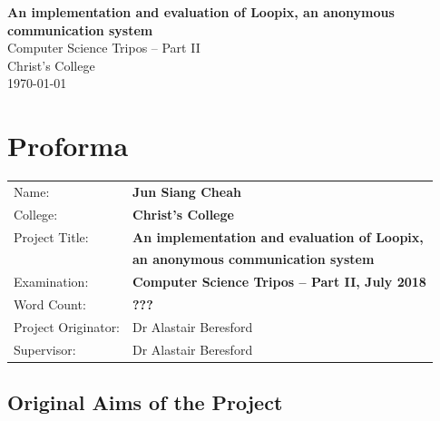 \documentclass[12pt,a4paper,twoside,openright]{report}
\begin{document}



\pagestyle{empty}


\vspace*{60mm}
\begin{center}
	\Huge
	\textbf{An implementation and evaluation of Loopix, an anonymous communication system} \\[5mm]
	Computer Science Tripos -- Part II \\[5mm]
	Christ's College \\[5mm]
	\today  %
\end{center}


\pagestyle{plain}

\chapter*{Proforma}

{\large
	\begin{tabular}{ll}
		Name:               & \bf Jun Siang Cheah                               \\
		College:            & \bf Christ's College                              \\
		Project Title:      & \bf An implementation and evaluation of Loopix,   \\ 
		& \bf an anonymous communication system             \\
		Examination:        & \bf Computer Science Tripos -- Part II, July 2018 \\
		Word Count:         & \bf ???                                           \\
		Project Originator: & Dr Alastair Beresford                             \\
		Supervisor:         & Dr Alastair Beresford                             \\ 
	\end{tabular}
}


\section*{Original Aims of the Project}
\end{document}
